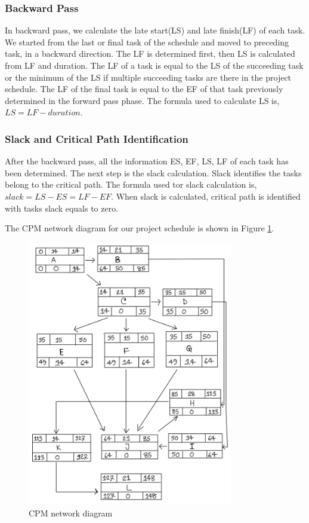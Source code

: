 \begin{spacing}{1}
\subsubsection{Backward Pass}
In backward pass, we calculate the late start(LS) and late finish(LF)  of each task. We started from the last or final task of the schedule and moved to preceding task, in a backward direction. The LF is determined first, then LS is calculated from LF and duration. The LF of a task is equal to the LS of the succeeding task or the minimum of the LS if multiple succeeding  tasks are there in the project schedule. The LF of the final task is equal to the EF of that task previously determined in the forward pass phase. The formula used to calculate LS is, $LS = LF - duration.$

\subsubsection{Slack and Critical Path Identification}
After the backward pass, all the information ES, EF, LS, LF of each task has been determined. The next step is the slack calculation. Slack identifies the tasks belong to the critical path. The formula used tor slack calculation is,$ slack =  LS - ES = LF - EF $. When slack is calculated, critical path is identified with tasks slack equals to zero. 

The CPM network diagram for our project schedule is shown in Figure \ref{fig:cpm}. 

\begin{figure}[H]
	\centering
	\includegraphics[width=0.8\textwidth]{CPM}
	\caption{CPM network diagram}
	\label{fig:cpm}
\end{figure}


\end{spacing}
